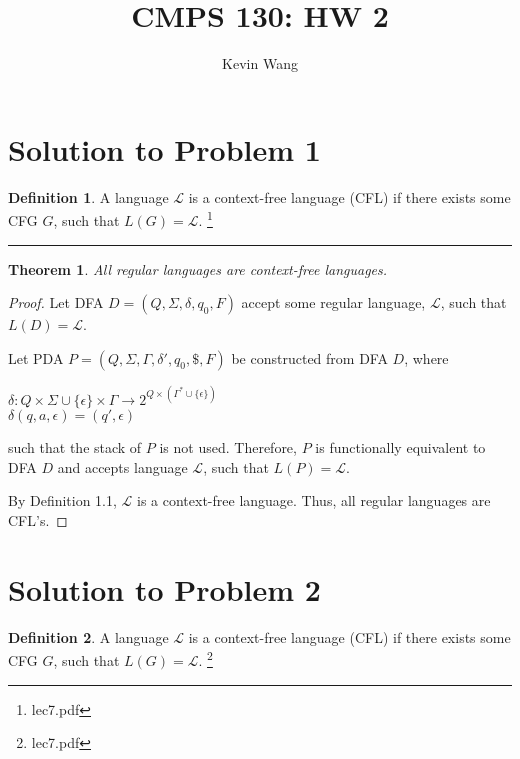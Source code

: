 \documentclass[11pt]{report}
\title{CMPS 130: HW 2}
\author{Kevin Wang}
\newcounter{problem}
\theoremstyle{definition}
\newtheorem{definition}{Definition}[problem]
\theoremstyle{plain}
\theoremstyle{plain}
\newtheorem{theorem*}{Theorem}
\begin{document}
\maketitle

\section*{Solution to Problem 1}

\begin{definition}
A language $\mathcal{L}$ is a context-free language (CFL) if there exists some CFG $G$, such that $L(G)=\mathcal{L}$.
\footnote{lec7.pdf}
\end{definition}

\hrule

\begin{theorem*}
All regular languages are context-free languages.
\end{theorem*}

\begin{proof}
Let DFA $D=(Q,\Sigma,\delta,q_{0},F)$ accept some regular language, $\mathcal{L}$, such that $L(D)=\mathcal{L}$. \newline

\noindent Let PDA $P=(Q,\Sigma,\Gamma,\delta', q_{0},\$,F)$ be constructed from DFA $D$, where
\begin{center}
$\delta : Q \times \Sigma \cup \{ \epsilon \} \times \Gamma \longrightarrow 2^{Q \times (\Gamma^{*} \cup \{ \epsilon \})}$ \\
$\delta (q,a,\epsilon) = (q', \epsilon)$
\end{center}
\noindent such that the stack of $P$ is not used. Therefore, $P$ is functionally equivalent to DFA $D$ 
and accepts language $\mathcal{L}$, such that $L(P)=\mathcal{L}$. \newline

\noindent By Definition 1.1, $\mathcal{L}$ is a context-free language. Thus, all regular languages are CFL's.
\end{proof}

\pagebreak

\section*{Solution to Problem 2}

\begin{definition}
A language $\mathcal{L}$ is a context-free language (CFL) if there exists some CFG $G$, such that $L(G)=\mathcal{L}$.
\footnote{lec7.pdf}
\end{definition}
\end{document}
